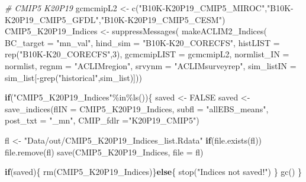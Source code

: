\documentclass[
]{article}
\newenvironment{Shaded}{\begin{snugshade}}{\end{snugshade}}
\newcommand{\AttributeTok}[1]{\textcolor[rgb]{0.77,0.63,0.00}{#1}}
\newcommand{\CommentTok}[1]{\textcolor[rgb]{0.56,0.35,0.01}{\textit{#1}}}
\newcommand{\ConstantTok}[1]{\textcolor[rgb]{0.00,0.00,0.00}{#1}}
\newcommand{\ControlFlowTok}[1]{\textcolor[rgb]{0.13,0.29,0.53}{\textbf{#1}}}
\newcommand{\DecValTok}[1]{\textcolor[rgb]{0.00,0.00,0.81}{#1}}
\newcommand{\FunctionTok}[1]{\textcolor[rgb]{0.00,0.00,0.00}{#1}}
\newcommand{\NormalTok}[1]{#1}
\newcommand{\OtherTok}[1]{\textcolor[rgb]{0.56,0.35,0.01}{#1}}
\newcommand{\SpecialCharTok}[1]{\textcolor[rgb]{0.00,0.00,0.00}{#1}}
\newcommand{\StringTok}[1]{\textcolor[rgb]{0.31,0.60,0.02}{#1}}
\begin{document}
\begin{Shaded}
\begin{Highlighting}[]
    \CommentTok{\# CMIP5 K20P19}
\NormalTok{    gcmcmipL2 }\OtherTok{\textless{}{-}} \FunctionTok{c}\NormalTok{(}\StringTok{"B10K{-}K20P19\_CMIP5\_MIROC"}\NormalTok{,}\StringTok{"B10K{-}K20P19\_CMIP5\_GFDL"}\NormalTok{,}\StringTok{"B10K{-}K20P19\_CMIP5\_CESM"}\NormalTok{) }
\NormalTok{    CMIP5\_K20P19\_Indices }\OtherTok{\textless{}{-}} \FunctionTok{suppressMessages}\NormalTok{(}
                        \FunctionTok{makeACLIM2\_Indices}\NormalTok{(}
                        \AttributeTok{BC\_target =} \StringTok{"mn\_val"}\NormalTok{,}
                        \AttributeTok{hind\_sim  =}  \StringTok{"B10K{-}K20\_CORECFS"}\NormalTok{,}
                        \AttributeTok{histLIST  =} \FunctionTok{rep}\NormalTok{(}\StringTok{"B10K{-}K20\_CORECFS"}\NormalTok{,}\DecValTok{3}\NormalTok{),}
                        \AttributeTok{gcmcmipLIST =}\NormalTok{ gcmcmipL2,}
                        \AttributeTok{normlist\_IN =}\NormalTok{ normlist,}
                        \AttributeTok{regnm    =} \StringTok{"ACLIMregion"}\NormalTok{,}
                        \AttributeTok{srvynm    =} \StringTok{"ACLIMsurveyrep"}\NormalTok{,}
                        \AttributeTok{sim\_listIN =}\NormalTok{ sim\_list[}\SpecialCharTok{{-}}\FunctionTok{grep}\NormalTok{(}\StringTok{"historical"}\NormalTok{,sim\_list)]))}
    
    \ControlFlowTok{if}\NormalTok{(}\StringTok{"CMIP5\_K20P19\_Indices"}\SpecialCharTok{\%in\%}\FunctionTok{ls}\NormalTok{())\{}
\NormalTok{      saved }\OtherTok{\textless{}{-}} \ConstantTok{FALSE}
\NormalTok{      saved }\OtherTok{\textless{}{-}} \FunctionTok{save\_indices}\NormalTok{(}\AttributeTok{flIN =}\NormalTok{ CMIP5\_K20P19\_Indices, }
                     \AttributeTok{subfl =} \StringTok{"allEBS\_means"}\NormalTok{,}
                     \AttributeTok{post\_txt =} \StringTok{"\_mn"}\NormalTok{,}
                     \AttributeTok{CMIP\_fdlr =}\StringTok{"K20P19\_CMIP5"}\NormalTok{)}
        
\NormalTok{        fl }\OtherTok{\textless{}{-}} \StringTok{"Data/out/CMIP5\_K20P19\_Indices\_list.Rdata"}
        \ControlFlowTok{if}\NormalTok{(}\FunctionTok{file.exists}\NormalTok{(fl)) }\FunctionTok{file.remove}\NormalTok{(fl)}
        \FunctionTok{save}\NormalTok{(CMIP5\_K20P19\_Indices, }\AttributeTok{file =}\NormalTok{ fl)}
        
        \ControlFlowTok{if}\NormalTok{(saved)\{}
        \FunctionTok{rm}\NormalTok{(CMIP5\_K20P19\_Indices)\}}\ControlFlowTok{else}\NormalTok{\{}
          \FunctionTok{stop}\NormalTok{(}\StringTok{"Indices not saved!"}\NormalTok{)}
\NormalTok{        \}}
        \FunctionTok{gc}\NormalTok{()}
\NormalTok{    \}}
    

\end{Highlighting}
\end{Shaded}
\end{document}
